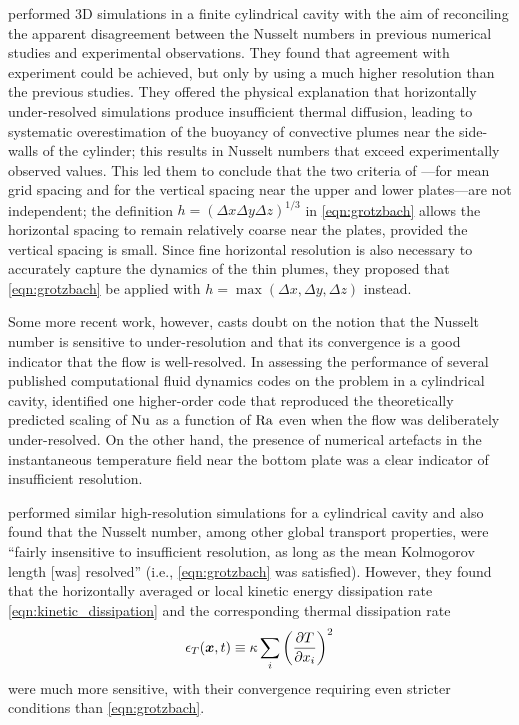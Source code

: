 \documentclass[../main.tex]{subfiles}
\begin{document}
\textcite{stevens2010} performed 3D simulations in a finite cylindrical cavity
with the aim of reconciling the apparent disagreement between the Nusselt
numbers in previous numerical studies and experimental observations. They found
that agreement with experiment could be achieved, but only by using a much
higher resolution than the previous studies. They offered the physical
explanation that horizontally under-resolved simulations produce insufficient
thermal diffusion, leading to systematic overestimation of the buoyancy of
convective plumes near the side-walls of the cylinder; this results in Nusselt
numbers that exceed experimentally observed values. This led them to conclude
that the two criteria of \textcite{grotzbach1983}---for mean grid spacing and
for the vertical spacing near the upper and lower plates---are not independent;
the definition $h = (\Delta x \Delta y \Delta z)^{1/3}$ in \cref{eqn:grotzbach}
allows the horizontal spacing to remain relatively coarse near the plates,
provided the vertical spacing is small. Since fine horizontal resolution is
also necessary to accurately capture the dynamics of the thin plumes, they
proposed that \cref{eqn:grotzbach} be applied with $h = \max(\Delta x, \Delta
y, \Delta z)$ instead.

Some more recent work, however, casts doubt on the notion that the Nusselt
number is sensitive to under-resolution and that its convergence is a good
indicator that the flow is well-resolved. In assessing the performance of
several published computational fluid dynamics codes on the \rb{} problem in a
cylindrical cavity, \textcite{kooij2018} identified one higher-order code that
reproduced the theoretically predicted scaling of $\mathrm{Nu}$ as a function of
$\mathrm{Ra}$ even when the flow was deliberately under-resolved. On the other
hand, the presence of numerical artefacts in the instantaneous temperature
field near the bottom plate was a clear indicator of insufficient resolution.

\textcite{scheel2013} performed similar high-resolution simulations for a
cylindrical cavity and also found that the Nusselt number, among other global
transport properties, were ``fairly insensitive to insufficient resolution, as
long as the mean Kolmogorov length [was] resolved'' (i.e., \cref{eqn:grotzbach}
was satisfied). However, they found that the horizontally averaged or local
kinetic energy dissipation rate \cref{eqn:kinetic_dissipation} and the
corresponding thermal dissipation rate
\begin{equation}
    \label{eqn:thermal_dissipation}
    \epsilon_T(\bm{x}, t) \equiv \kappa \sum_i \left(\frac{\partial T}{\partial x_i}\right)^2
\end{equation}
were much more sensitive, with their convergence requiring even stricter
conditions than \cref{eqn:grotzbach}.
\end{document}
